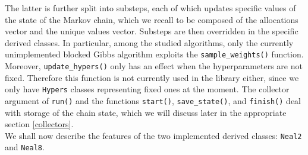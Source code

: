 The latter is further split into substeps, each of which updates specific values of the state of the Markov chain, which we recall to be composed of the allocations vector and the unique values vector.
Substeps are then overridden in the specific derived classes.
In particular, among the studied algorithms, only the currently unimplemented blocked Gibbs algorithm exploits the \verb|sample_weights()| function.
Moreover, \verb|update_hypers()| only has an effect when the hyperparameters are not fixed.
Therefore this function is not currently used in the library either, since we only have \verb|Hypers| classes representing fixed ones at the moment.
The collector argument of \verb|run()| and the functions \verb|start()|, \verb|save_state()|, and \verb|finish()| deal with storage of the chain state, which we will discuss later in the appropriate section \ref{collectors}. \\
We shall now describe the features of the two implemented derived classes: \verb|Neal2| and \verb|Neal8|.

